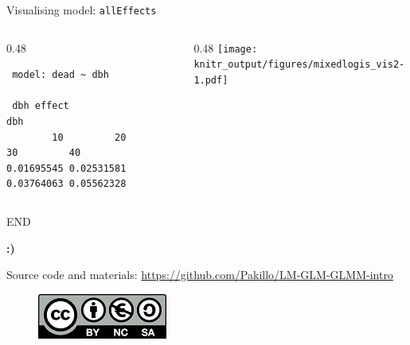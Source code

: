 \documentclass[10pt,ignorenonframetext,]{beamer}
\def\begincols{\begin{columns}[c]}
\def\endcols{\end{columns}}
\def\begincol{\begin{column}{0.48\textwidth}}
\def\endcol{\end{column}}
\begin{document}
\begin{frame}[fragile]{Visualising model: \texttt{allEffects}}

\begincols
\begincol

\begin{verbatim}
 model: dead ~ dbh

 dbh effect
dbh
        10         20         30         40 
0.01695545 0.02531581 0.03764063 0.05562328 
\end{verbatim}

\endcol

\begincol
\texttt{[image: knitr\_output/figures/mixedlogis\_vis2-1.pdf]} \endcol
\endcols

\end{frame}

\begin{frame}{END}

\textbf{:)}

Source code and materials:
\url{https://github.com/Pakillo/LM-GLM-GLMM-intro}

\begin{figure}[htbp]
\centering
\includegraphics{images/CClogo.png}
\caption{}
\end{figure}

\end{frame}
\end{document}
